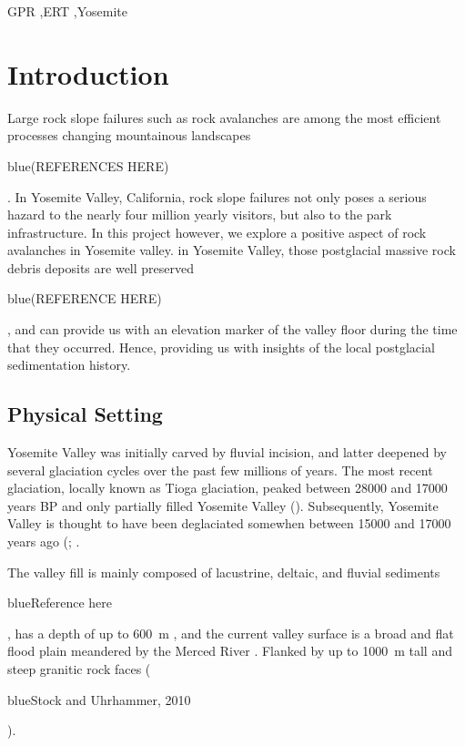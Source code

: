 \documentclass[5p]{elsarticle}
\newcommand{\COMON}{\begin{color}{blue}}
\newcommand{\COMOFF}{\end{color}}
\begin{document}
\begin{frontmatter}
\begin{abstract}
									\end{abstract}

					\begin{keyword}
GPR \sep ERT \sep Yosemite
					\end{keyword}

	\end{frontmatter}







\section{Introduction}

Large rock slope failures such as rock avalanches are among the most efficient processes changing mountainous landscapes \COMON (REFERENCES HERE) \COMOFF.
In Yosemite Valley, California, rock slope failures not only poses a serious hazard to the nearly four million yearly visitors, but also to the park infrastructure. In this project however, we explore a positive aspect of rock avalanches in Yosemite valley. in Yosemite Valley, those postglacial massive rock debris deposits  are well preserved \COMON (REFERENCE HERE) \COMOFF, and can provide us with an elevation marker of the valley floor during the time that they occurred.  Hence, providing us with insights of the local postglacial sedimentation history.  
\bigskip



\subsection{Physical Setting}

Yosemite Valley was initially carved by fluvial incision, and latter deepened by several glaciation cycles over the past few millions of years. The most recent glaciation, locally known as Tioga glaciation, peaked between \num{28000} and \num{17000} years BP and only partially filled  Yosemite Valley (\cite{huber1987geologic}). Subsequently, Yosemite Valley is thought to have been deglaciated somewhen between \num{15000} and \num{17000} years ago (\cite{huber1987geologic};  \cite{Wieczorek+1996}.

The valley fill is mainly composed of lacustrine, deltaic, and fluvial sediments \COMON Reference here\COMOFF, has a depth of up to \SI{600}{m} \cite{gutenberg1956seismic}, and the current valley surface is a broad and flat flood plain meandered by the Merced River \cite{Wieczorek+1996}. Flanked by up to \SI{1000}{m} tall and steep granitic rock faces (\COMON Stock and Uhrhammer, 2010 \COMOFF).
\bigskip
    
\end{document}
